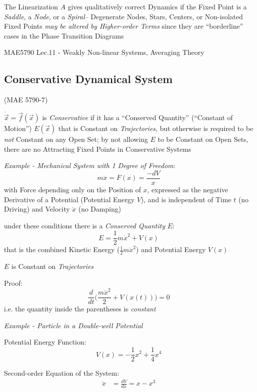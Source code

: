 The Linearization $A$ gives qualitatively correct Dynamics if the Fixed Point
is a \emph{Saddle}, a \emph{Node}, or a \emph{Spiral}--
Degenerate Nodes, Stars, Centers, or Non-isolated Fixed Points \emph{may be
altered by Higher-order Terms} since they are ``borderline'' cases in the Phase
Transition Diagrams

MAE5790 Lec.11 - Weakly Non-linear Systems, Averaging Theory



\subsection{Conservative Dynamical System}
\label{sec:conservative_dynamical_system}

(MAE 5790-7)

$\dot{\vec{x}} = \vec{f}(\vec{x})$ is \emph{Conservative} if it has a
``Conserved Quantity'' (``Constant of Motion'') $E(\vec{x})$ that is Constant
on \emph{Trajectories}, but otherwise is required to be \emph{not} Constant on
any Open Set;
by not allowing $E$ to be Constant on Open Sets, there are no Attracting Fixed
Points in Conservative Systems

\emph{Example - Mechanical System with 1 Degree of Freedom}:
\[
  m\ddot{x} = F(x) = \frac{-dV}{x}
\]
with Force depending only on the Position of $x$, expressed as the negative
Derivative of a Potential (Potential Energy $V$), and is independent of Time
$t$ (no Driving) and Velocity $\dot{x}$ (no Damping)

under these conditions there is a \emph{Conserved Quantity} $E$:
\[
  E = \frac{1}{2}m\dot{x}^2 + V(x)
\]
that is the combined Kinetic Energy ($\frac{1}{2}m\dot{x}^2$) and Potential
Energy $V(x)$

$E$ is Constant on \emph{Trajectories}

Proof:
\[
  \frac{d}{dt}\Big(\frac{m\dot{x}^2}{2} + V(x(t))\Big) = 0
\]
i.e. the quantity inside the parentheses is \emph{constant}


\emph{Example - Particle in a Double-well Potential}

Potential Energy Function:
\[
  V(x) = -\frac{1}{2}x^2 + \frac{1}{4}x^4
\]

Second-order Equation of the System:
\begin{align*}
  \ddot{x} & = \frac{dV}{dx} = x - x^3
\end{align*}

